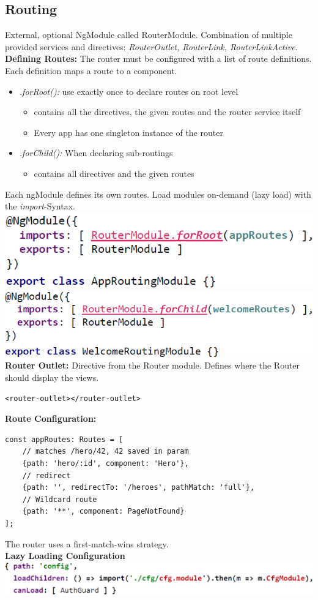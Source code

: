 \subsection{Routing}
External, optional NgModule called RouterModule.
Combination of multiple provided services and directives: \textit{RouterOutlet, RouterLink, RouterLinkActive}.\\
\textbf{Defining Routes:} The router must be configured with a list of route definitions.
Each definition maps a route to a component.
\begin{itemize}
    \item \textit{.forRoot():} use exactly once to declare routes on root level
    \begin{itemize}
        \item contains all the directives, the given routes and the router service itself
        \item Every app has one singleton instance of the router
    \end{itemize}
    \item \textit{.forChild():} When declaring sub-routings
    \begin{itemize}
        \item contains all directives and the given routes
    \end{itemize}
\end{itemize}
Each ngModule defines its own routes.
Load modules on-demand (lazy load) with the \textit{import}-Syntax.\\
\includegraphics[width=0.5\linewidth]{img/angular_routing.png}
\includegraphics[width=0.5\linewidth]{img/angular_routing2.png}
\textbf{Router Outlet:} Directive from the Router module.
Defines where the Router should display the views.
\begin{lstlisting}
<router-outlet></router-outlet>
\end{lstlisting}
\textbf{Route Configuration:}
\begin{lstlisting}
const appRoutes: Routes = [
    // matches /hero/42, 42 saved in param
    {path: 'hero/:id', component: 'Hero'},
    // redirect
    {path: '', redirectTo: '/heroes', pathMatch: 'full'},
    // Wildcard route
    {path: '**', component: PageNotFound}
];
\end{lstlisting}
The router uses a first-match-wins strategy.\\
\textbf{Lazy Loading Configuration}\\
\includegraphics[width=0.8\linewidth]{img/angular_lazy_loading_routes.png}


